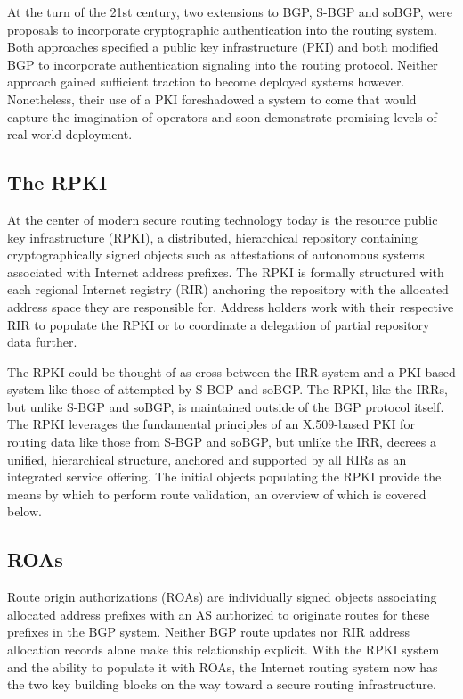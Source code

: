 \documentclass[sigconf]{acmart}
\begin{document}
At the turn of the 21st century, two extensions to BGP, S-BGP and soBGP,
were proposals to incorporate cryptographic authentication into the
routing system.\cite{kent_secure_2000}\cite{white_securing_2003}  Both
approaches specified a public key infrastructure (PKI) and both modified
BGP to incorporate authentication signaling into the routing protocol.
Neither approach gained sufficient traction to become deployed systems
however.  Nonetheless, their use of a PKI foreshadowed a system to come
that would capture the imagination of operators and soon demonstrate
promising levels of real-world deployment.

\subsection{The RPKI}

At the center of modern secure routing technology today is the resource
public key infrastructure (RPKI), a distributed, hierarchical repository
containing cryptographically signed objects such as attestations of
autonomous systems associated with Internet address
prefixes.\cite{lepinski_infrastructure_2012}  The RPKI is formally
structured with each regional Internet registry (RIR) anchoring the
repository with the allocated address space they are responsible for.
Address holders work with their respective RIR to populate the RPKI or
to coordinate a delegation of partial repository data further.

The RPKI could be thought of as cross between the IRR system and a
PKI-based system like those of attempted by S-BGP and soBGP.  The RPKI,
like the IRRs, but unlike S-BGP and soBGP, is maintained outside of the
BGP protocol itself.  The RPKI leverages the fundamental principles of
an X.509-based PKI for routing data like those from S-BGP and soBGP, but
unlike the IRR, decrees a unified, hierarchical structure, anchored and
supported by all RIRs as an integrated service offering.  The initial
objects populating the RPKI provide the means by which to perform route
validation, an overview of which is covered below.

\subsection{ROAs}

Route origin authorizations (ROAs) are individually signed objects
associating allocated address prefixes with an AS authorized to
originate routes for these prefixes in the BGP system.  Neither BGP
route updates nor RIR address allocation records alone make this
relationship explicit.  With the RPKI system and the ability to populate
it with ROAs, the Internet routing system now has the two key building
blocks on the way toward a secure routing infrastructure.
\end{document}
